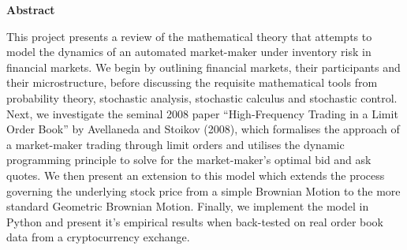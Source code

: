 \thispagestyle{plain}
\mbox{}
\vspace{60mm}
\begin{center}
    \textbf{Abstract}
\end{center}
This project presents a review of the mathematical theory that attempts to model the dynamics of an 
automated market-maker under inventory risk in financial markets. We begin by outlining financial markets, 
their participants and their microstructure, before discussing the requisite mathematical tools from probability theory, 
stochastic analysis, stochastic calculus and stochastic control. Next, we investigate the seminal 2008 paper 
``High-Frequency Trading in a Limit Order Book'' by Avellaneda and Stoikov (2008), which formalises the approach of a 
market-maker trading through limit orders and utilises the dynamic programming principle to solve for the market-maker's 
optimal bid and ask quotes. We then present an extension to this model which extends the process governing the 
underlying stock price from a simple Brownian Motion to the more standard Geometric Brownian Motion. 
Finally, we implement the model in Python and present it's empirical results when back-tested on real order book data 
from a cryptocurrency exchange.
\newpage